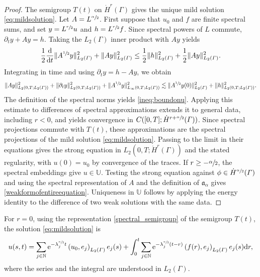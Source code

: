 \documentclass[numbers,webpdf]{ima-authoring-template}%
\theoremstyle{thmstyletwo}%
\numberwithin{equation}{section}
\begin{document}
\begin{proof}
The semigroup $T(t)$ on $\dot{H}^{r}(\Gamma)$ gives the unique mild solution \eqref{eq:mildsolution}. Let $A=L^{\sfrac{\alpha}{2}}$. First suppose that $u_0$ and $f$ are finite spectral sums, and set $y=L^{\sfrac{r}{2}}u$ and $h=L^{\sfrac{r}{2}}f$. Since spectral powers of $L$ commute, $\partial_ty+Ay=h$. Taking the $L_2(\Gamma)$ inner product with $Ay$ yields
\begin{align*}
    \frac12\frac{\dd}{\dd t}\|A^{\sfrac{1}{2}}y\|_{L_2({\mit\varGamma})}^2
    +\|Ay\|_{L_2({\mit\varGamma})}^2
    \leq\frac12\|h\|_{L_2({\mit\varGamma})}^2
    +\frac12\|Ay\|_{L_2({\mit\varGamma})}^2.
\end{align*}
Integrating in time and using $\partial_ty=h-Ay$, we obtain
\begin{align*}
    \|Ay\|_{L_2(0,T;L_2({\mit\varGamma}))}^2 +\|\partial_ty\|_{L_2(0,T;L_2({\mit\varGamma}))}^2 +\|A^{\sfrac{1}{2}}y\|_{L_\infty(0,T;L_2({\mit\varGamma}))}^2 \lesssim\|A^{\sfrac{1}{2}}y(0)\|_{L_2({\mit\varGamma})}^2 +\|h\|_{L_2(0,T;L_2({\mit\varGamma}))}^2.
\end{align*}
The definition of the spectral norms yields \eqref{ineq:boundonu}. Applying this estimate to differences of spectral approximations extends it to general data, including $r<0$, and yields convergence in $C([0,T];\dot{H}^{r+\sfrac{\alpha}{2}}({\mit\varGamma}))$. Since spectral projections commute with $T(t)$, these approximations are the spectral projections of the mild solution \eqref{eq:mildsolution}. Passing to the limit in their equations gives the strong equation in $L_2(0,T;\dot{H}^{r}(\Gamma))$ and the stated regularity, with $u(0)=u_0$ by convergence of the traces. If $r\geq-\sfrac{\alpha}{2}$, the spectral embeddings give $u\in\mathbb{U}$. Testing the strong equation against $\phi\in\dot{H}^{\sfrac{\alpha}{2}}({\mit\varGamma})$ and using the spectral representation of $A$ and the definition of $\mathfrak{a}_{\alpha}$ gives \eqref{weakformofentireequation}. Uniqueness in $\mathbb{U}$ follows by applying the energy identity to the difference of two weak solutions with the same data.
\hfill
\end{proof}
For $r=0$, using the representation \eqref{spectral_semigroup} of the semigroup $T(t)$, the solution \eqref{eq:mildsolution} is
\begin{equation}
\label{eq:sol_reprentation}
        u(s,t) = \displaystyle\sum_{j\in\mathbb{N}}\mathrm{e}^{-\lambda^{\sfrac{\alpha}{2}}_jt}\left(u_0, e_j\right)_{L_2({\mit\varGamma})}e_j(s) + \int_0^t \displaystyle\sum_{j\in\mathbb{N}}\mathrm{e}^{-\lambda^{\sfrac{\alpha}{2}}_j(t-r)}\left(f(r), e_j\right)_{L_2({\mit\varGamma})}e_j(s)\dd r,
\end{equation}
where the series and the integral are understood in $L_2(\Gamma)$.
\end{document}
